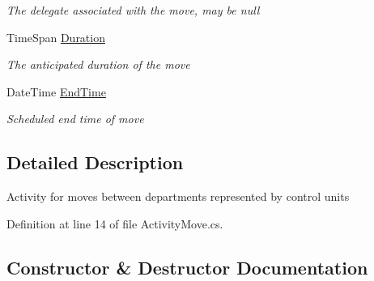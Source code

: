 \begin{DoxyCompactItemize}
\begin{DoxyCompactList}\small\item\em The delegate associated with the move, may be null \end{DoxyCompactList}\item 
Time\+Span \hyperlink{class_general_health_care_elements_1_1_activities_1_1_activity_move_af759c4886cdab10fbc7682b7ce9db513}{Duration}
\begin{DoxyCompactList}\small\item\em The anticipated duration of the move \end{DoxyCompactList}\item 
Date\+Time \hyperlink{class_general_health_care_elements_1_1_activities_1_1_activity_move_a15980148c18781b501c0f876124d9dc8}{End\+Time}
\begin{DoxyCompactList}\small\item\em Scheduled end time of move \end{DoxyCompactList}\end{DoxyCompactItemize}


\subsection{Detailed Description}
Activity for moves between departments represented by control units 



Definition at line 14 of file Activity\+Move.\+cs.



\subsection{Constructor \& Destructor Documentation}
